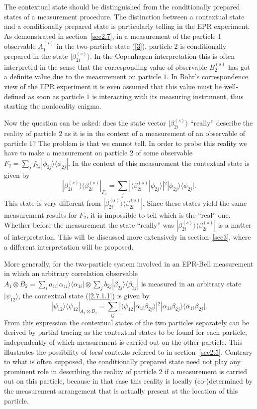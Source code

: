 \documentclass[12pt]{article}
\begin{document}
The contextual state should be distinguished from the
conditionally prepared states of a measurement procedure. The
distinction between a contextual state and a conditionally
prepared state is particularly telling in the EPR experiment. As
demonstrated in section~\ref{sec2.7}, in a measurement of the
particle $1$ observable $A_1^{(s)} $ in the two-particle state
(\ref{3}), particle $2$ is conditionally prepared in the state
$|\beta^{(s)}_{2i}\rangle$. In the Copenhagen interpretation this
is often interpreted in the sense that the corresponding value of
observable $B_2^{(s)} $ has got a definite value due to the
measurement on particle $1$. In Bohr's correspondence view of the
EPR experiment it is even assumed that this value must be
well-defined as soon as particle $1$ is interacting with its
measuring instrument, thus starting the nonlocality enigma.

Now the question can be asked: does the state vector
$|\beta^{(s)}_{2i}\rangle$ ``really'' describe the reality of
particle $2$ as it is in the context of a measurement of an
observable of particle $1$? The problem is that we cannot tell. In
order to probe this reality we have to make a measurement on
particle $2$ of some observable $F_2= \sum_j f_{2j}
|\phi_{2j}\rangle\langle \phi_{2j}|$. In the context of this
measurement the contextual state is given by
\[|\beta^{(s)}_{2i}\rangle\langle\beta^{(s)}_{2i}|_{F_2} =\sum_j
|\langle
\beta^{(s)}_{2i}|\phi_{2j}\rangle|^2|\phi_{2j}\rangle\langle
\phi_{2j}|.\] This state is very different from
$|\beta^{(s)}_{2i}\rangle\langle \beta^{(s)}_{2i}|$. Since these
states yield the same measurement results for $F_2$, it is
impossible to tell which is the ``real'' one. Whether before the
measurement the state ``really'' was
$|\beta^{(s)}_{2i}\rangle\langle \beta^{(s)}_{2i}|$ is a matter
of interpretation. This will be discussed more extensively in
section~\ref{sec3}, where a different interpretation will be proposed.

More generally, for the two-particle system involved
in an EPR-Bell measurement in which an arbitrary correlation
observable $A_1\otimes B_2 = \sum_{i}
a_{1i}|\alpha_{1i}\rangle\langle\alpha_{1i}| \otimes \sum_j b_{2j}
|\beta_{2j}\rangle\langle\beta_{2j}| $ is measured in an arbitrary
state $|\psi_{12}\rangle$, the contextual state (\ref{2.7.1.1}) is
given by
\[|\psi_{12}\rangle\langle\psi_{12}|_{A_1\otimes B_2}= \sum_{ij}
|\langle\psi_{12}|\alpha_{1i}\beta_{2j}\rangle|^2
|\alpha_{1i}\beta_{2j}\rangle\langle\alpha_{1i}\beta_{2j}|.\] From
this expression the contextual states of the two particles
separately can be derived by partial tracing as the contextual
states to be found for each particle, independently of which
measurement is carried out on the other particle. This illustrates
the possibility of {\em local} contexts referred to in
section~\ref{sec2.5}. Contrary to what is often supposed, the
conditionally prepared state need not play any prominent role in
describing the reality of particle $2$ if a measurement is carried
out on this particle, because in that case this reality is locally
(co-)determined by the measurement arrangement that is actually
present at the location of this particle.
\end{document}
